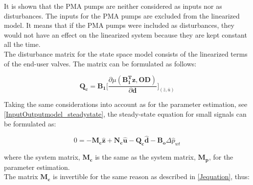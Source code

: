 %
%
%
It is shown that the PMA pumps are neither considered as inputs nor as disturbances. The inputs for the PMA pumps are excluded from the linearized model. It means that if the PMA pumps were included as disturbances, they would not have an effect on the linearized system because they are kept constant all the time. 
\\
The disturbance matrix for the state space model consists of the linearized terms of the end-user valves. The matrix can be formulated as follows: 

\begin{equation}
  \bm{Q_c} = \bm{B_1} \bigg[ \frac{\partial{\mu(\bm{{B_1^{T}}}\bm{z}, \bm{OD})}}{{\partial{\bm{d}}}}  \bigg]_{(\bar{z}, \bar{u})}  
\label{disturbance_matrix}
\end{equation}

Taking the same considerations into account as for the parameter estimation, see \eqref{InputOutputmodel_steadystate}, the steady-state equation for small signals can be formulated as: 

 \begin{equation}
 0 = -\bm{M_c} \bm{\hat{z}} + \bm{N_c} \bm{\hat{u}} - \bm{Q_c} \bm{\hat{d}} - \bm{B_o} \Delta \hat{p}_{wt}    
 \label{statespace_control_sys}
\end{equation}

where the system matrix, $\bm{M_c}$ is the same as the system matrix, $\bm{M_p}$, for the parameter estimation. 
\\
The matrix $\bm{M_c}$ is invertible for the same reason as described in \eqref{Jequation}, thus:

